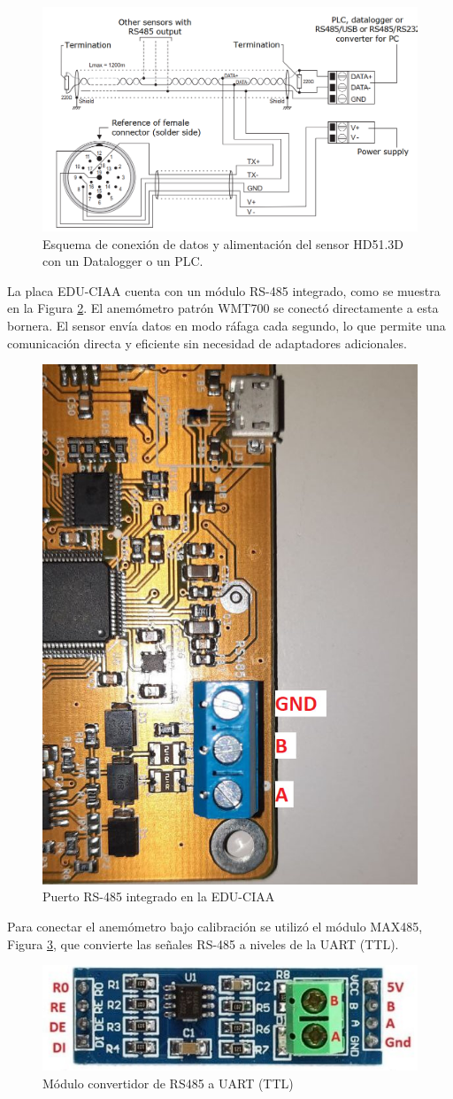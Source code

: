 \begin{figure}[H]
    \centering
    \includegraphics[width=0.9\linewidth]{Figuras/datalogger/Hardware/rs485DeltaOhm.png}
    \caption{Esquema de conexión de datos y alimentación del sensor HD51.3D con un Datalogger o un PLC.}
    \label{fig:rs485DeltaOhm}
\end{figure}
La placa EDU-CIAA cuenta con un módulo RS-485 integrado, como se muestra en la Figura \ref{fig:rs485CIAA}. El anemómetro patrón WMT700 se conectó directamente a esta bornera. El sensor envía datos en modo ráfaga cada segundo, lo que permite una comunicación directa y eficiente sin necesidad de adaptadores adicionales.
\begin{figure}[H]
    \centering
    \includegraphics[width=0.35\linewidth]{Figuras/datalogger/Hardware/rs485CIAA.jpg}
    \caption{Puerto RS-485 integrado en la EDU-CIAA}
    \label{fig:rs485CIAA}
\end{figure}

Para conectar el anemómetro bajo calibración se utilizó el módulo MAX485, Figura \ref{fig:moduleMax485}, que convierte las señales RS-485 a niveles de la UART (TTL). 

\begin{figure}[H]
    \centering
    \includegraphics[width=0.55\linewidth]{Figuras/datalogger/Hardware/moduleMax485.png}
    \caption{Módulo convertidor de RS485 a UART (TTL)}
    \label{fig:moduleMax485}
\end{figure}

